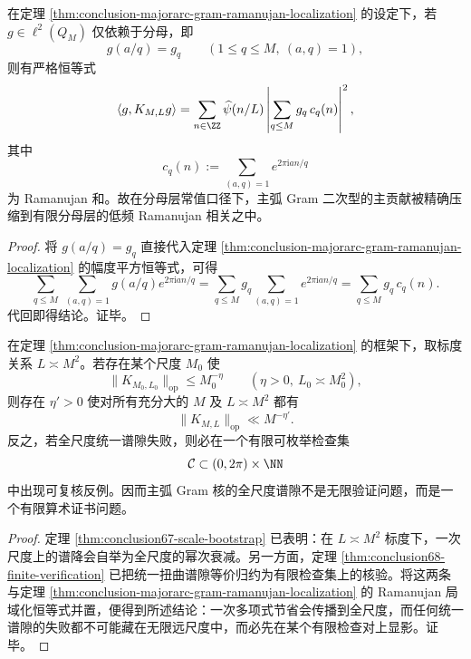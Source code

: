 \begin{corollary}\label{cor:conclusion-majorarc-gram-denominator-constant-ramanujan-correlation}
在定理 \ref{thm:conclusion-majorarc-gram-ramanujan-localization} 的设定下，若 \(g\in \ell^2(Q_M)\) 仅依赖于分母，即
\[
g(a/q)=g_q
\qquad
(1\le q\le M,\ (a,q)=1),
\]
则有严格恒等式
\[
\langle g,K_{M,L}g\rangle
=
\sum_{n\in\ZZ}\widehat\psi(n/L)
\left|
\sum_{q\le M} g_q\,c_q(n)
\right|^2,
\]
其中
\[
c_q(n):=\sum_{(a,q)=1}e^{2\pi\mathrm{i}an/q}
\]
为 Ramanujan 和。故在分母层常值口径下，主弧 Gram 二次型的主贡献被精确压缩到有限分母层的低频 Ramanujan 相关之中。
\end{corollary}
\begin{proof}
将
\(
g(a/q)=g_q
\)
直接代入定理 \ref{thm:conclusion-majorarc-gram-ramanujan-localization} 的幅度平方恒等式，可得
\[
\sum_{q\le M}\ \sum_{(a,q)=1}g(a/q)e^{2\pi\mathrm{i}an/q}
=
\sum_{q\le M} g_q \sum_{(a,q)=1}e^{2\pi\mathrm{i}an/q}
=
\sum_{q\le M} g_q\,c_q(n).
\]
代回即得结论。证毕。
\end{proof}

\begin{theorem}[有限算术证书对全尺度谱隙的完备控制]\label{thm:conclusion-finite-arithmetic-certificates-control-fullscale-gap}
在定理 \ref{thm:conclusion-majorarc-gram-ramanujan-localization} 的框架下，取标度关系 \(L\asymp M^2\)。若存在某个尺度 \(M_0\) 使
\[
\|K_{M_0,L_0}\|_{\mathrm{op}}\le M_0^{-\eta}
\qquad
(\eta>0,\ L_0\asymp M_0^2),
\]
则存在 \(\eta'>0\) 使对所有充分大的 \(M\) 及 \(L\asymp M^2\) 都有
\[
\|K_{M,L}\|_{\mathrm{op}}\ll M^{-\eta'}.
\]
反之，若全尺度统一谱隙失败，则必在一个有限可枚举检查集
\[
\mathcal C\subset (0,2\pi)\times \NN
\]
中出现可复核反例。因而主弧 Gram 核的全尺度谱隙不是无限验证问题，而是一个有限算术证书问题。
\end{theorem}
\begin{proof}
定理 \ref{thm:conclusion67-scale-bootstrap} 已表明：在 \(L\asymp M^2\) 标度下，一次尺度上的谱降会自举为全尺度的幂次衰减。另一方面，定理 \ref{thm:conclusion68-finite-verification} 已把统一扭曲谱隙等价归约为有限检查集上的核验。将这两条与定理 \ref{thm:conclusion-majorarc-gram-ramanujan-localization} 的 Ramanujan 局域化恒等式并置，便得到所述结论：一次多项式节省会传播到全尺度，而任何统一谱隙的失败都不可能藏在无限远尺度中，而必先在某个有限检查对上显影。证毕。
\end{proof}

